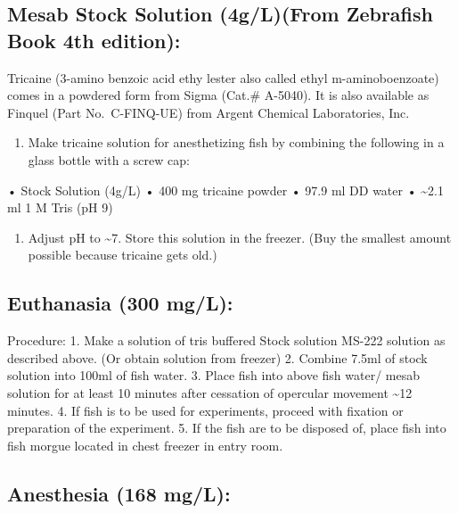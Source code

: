 \documentclass[
]{book}
\providecommand{\tightlist}{%
  \setlength{\itemsep}{0pt}\setlength{\parskip}{0pt}}
\begin{document}
\hypertarget{mesab-stock-solution-4glfrom-zebrafish-book-4th-edition}{%
\subsection{Mesab Stock Solution (4g/L)(From Zebrafish Book 4th edition):}\label{mesab-stock-solution-4glfrom-zebrafish-book-4th-edition}}

Tricaine (3-amino benzoic acid ethy lester also called ethyl m-aminoboenzoate) comes in a powdered form from Sigma (Cat.\# A-5040). It is also available as Finquel (Part No.~C-FINQ-UE) from Argent Chemical Laboratories, Inc.~

\begin{enumerate}
\def\labelenumi{\arabic{enumi}.}
\tightlist
\item
  Make tricaine solution for anesthetizing fish by combining the following in a glass bottle with a screw cap:
\end{enumerate}

• Stock Solution (4g/L)
• 400 mg tricaine powder
• 97.9 ml DD water
• \textasciitilde2.1 ml 1 M Tris (pH 9)

\begin{enumerate}
\def\labelenumi{\arabic{enumi}.}
\setcounter{enumi}{1}
\tightlist
\item
  Adjust pH to \textasciitilde7. Store this solution in the freezer. (Buy the smallest amount possible because tricaine gets old.)
\end{enumerate}

\hypertarget{euthanasia-300-mgl}{%
\subsection{Euthanasia (300 mg/L):}\label{euthanasia-300-mgl}}

Procedure:
1. Make a solution of tris buffered Stock solution MS-222 solution as described above. (Or obtain solution from freezer)
2. Combine 7.5ml of stock solution into 100ml of fish water.
3. Place fish into above fish water/ mesab solution for at least 10 minutes after cessation of opercular movement \textasciitilde12 minutes.
4. If fish is to be used for experiments, proceed with fixation or preparation of the experiment.
5. If the fish are to be disposed of, place fish into fish morgue located in chest freezer in entry room.

\hypertarget{anesthesia-168-mgl}{%
\subsection{Anesthesia (168 mg/L):}\label{anesthesia-168-mgl}}
\end{document}
